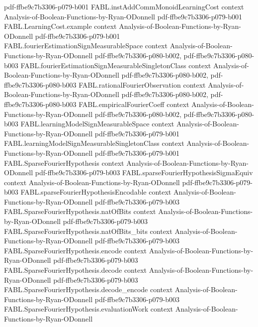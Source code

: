 \begin{theorem}
  {pdf-ffbe9c7b3306-p079-b001}
\proofstep
  {FABL.instAddCommMonoidLearningCost}
  {context}
  {Analysis-of-Boolean-Functions-by-Ryan-ODonnell}
  {pdf-ffbe9c7b3306-p079-b001}
\proofstep
  {FABL.LearningCost.example}
  {context}
  {Analysis-of-Boolean-Functions-by-Ryan-ODonnell}
  {pdf-ffbe9c7b3306-p079-b001}
\proofstep
  {FABL.fourierEstimationSignMeasurableSpace}
  {context}
  {Analysis-of-Boolean-Functions-by-Ryan-ODonnell}
  {pdf-ffbe9c7b3306-p080-b002,
    pdf-ffbe9c7b3306-p080-b003}
\proofstep
  {FABL.fourierEstimationSignMeasurableSingletonClass}
  {context}
  {Analysis-of-Boolean-Functions-by-Ryan-ODonnell}
  {pdf-ffbe9c7b3306-p080-b002,
    pdf-ffbe9c7b3306-p080-b003}
\proofstep
  {FABL.rationalFourierObservation}
  {context}
  {Analysis-of-Boolean-Functions-by-Ryan-ODonnell}
  {pdf-ffbe9c7b3306-p080-b002,
    pdf-ffbe9c7b3306-p080-b003}
\proofstep
  {FABL.empiricalFourierCoeff}
  {context}
  {Analysis-of-Boolean-Functions-by-Ryan-ODonnell}
  {pdf-ffbe9c7b3306-p080-b002,
    pdf-ffbe9c7b3306-p080-b003}
\proofstep
  {FABL.learningModelSignMeasurableSpace}
  {context}
  {Analysis-of-Boolean-Functions-by-Ryan-ODonnell}
  {pdf-ffbe9c7b3306-p079-b001}
\proofstep
  {FABL.learningModelSignMeasurableSingletonClass}
  {context}
  {Analysis-of-Boolean-Functions-by-Ryan-ODonnell}
  {pdf-ffbe9c7b3306-p079-b001}
\proofstep
  {FABL.SparseFourierHypothesis}
  {context}
  {Analysis-of-Boolean-Functions-by-Ryan-ODonnell}
  {pdf-ffbe9c7b3306-p079-b003}
\proofstep
  {FABL.sparseFourierHypothesisSigmaEquiv}
  {context}
  {Analysis-of-Boolean-Functions-by-Ryan-ODonnell}
  {pdf-ffbe9c7b3306-p079-b003}
\proofstep
  {FABL.sparseFourierHypothesisEncodable}
  {context}
  {Analysis-of-Boolean-Functions-by-Ryan-ODonnell}
  {pdf-ffbe9c7b3306-p079-b003}
\proofstep
  {FABL.SparseFourierHypothesis.natOfBits}
  {context}
  {Analysis-of-Boolean-Functions-by-Ryan-ODonnell}
  {pdf-ffbe9c7b3306-p079-b003}
\proofstep
  {FABL.SparseFourierHypothesis.natOfBits_bits}
  {context}
  {Analysis-of-Boolean-Functions-by-Ryan-ODonnell}
  {pdf-ffbe9c7b3306-p079-b003}
\proofstep
  {FABL.SparseFourierHypothesis.encode}
  {context}
  {Analysis-of-Boolean-Functions-by-Ryan-ODonnell}
  {pdf-ffbe9c7b3306-p079-b003}
\proofstep
  {FABL.SparseFourierHypothesis.decode}
  {context}
  {Analysis-of-Boolean-Functions-by-Ryan-ODonnell}
  {pdf-ffbe9c7b3306-p079-b003}
\proofstep
  {FABL.SparseFourierHypothesis.decode_encode}
  {context}
  {Analysis-of-Boolean-Functions-by-Ryan-ODonnell}
  {pdf-ffbe9c7b3306-p079-b003}
\proofstep
  {FABL.SparseFourierHypothesis.evaluationWork}
  {context}
  {Analysis-of-Boolean-Functions-by-Ryan-ODonnell}

\end{theorem}
